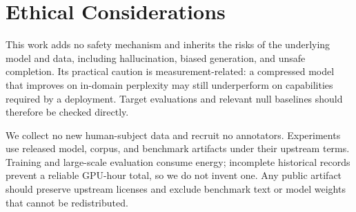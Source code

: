 \section*{Ethical Considerations}
This work adds no safety mechanism and inherits the risks of the underlying
model and data, including hallucination, biased generation, and unsafe
completion. Its practical caution is measurement-related: a compressed model
that improves on in-domain perplexity may still underperform on capabilities
required by a deployment. Target evaluations and relevant null baselines should
therefore be checked directly.

We collect no new human-subject data and recruit no annotators. Experiments use
released model, corpus, and benchmark artifacts under their upstream terms.
Training and large-scale evaluation consume energy; incomplete historical
records prevent a reliable GPU-hour total, so we do not invent one. Any public
artifact should preserve upstream licenses and exclude benchmark text or model
weights that cannot be redistributed.

